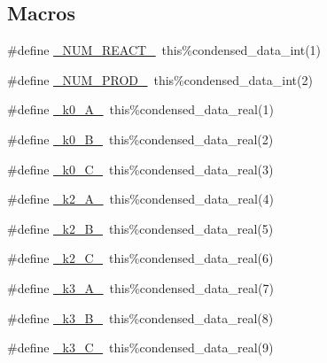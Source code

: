 \subsection*{Macros}
\begin{DoxyCompactItemize}
\item 
\#define \mbox{\hyperlink{rxn___c_m_a_q___o_h___h_n_o3_8_f90_aee1fee52189b85b8a55162815b7eb2ab}{\+\_\+\+N\+U\+M\+\_\+\+R\+E\+A\+C\+T\+\_\+}}~this\%condensed\+\_\+data\+\_\+int(1)
\item 
\#define \mbox{\hyperlink{rxn___c_m_a_q___o_h___h_n_o3_8_f90_a0ab2d7e00e334b5c52335f26ef6025e8}{\+\_\+\+N\+U\+M\+\_\+\+P\+R\+O\+D\+\_\+}}~this\%condensed\+\_\+data\+\_\+int(2)
\item 
\#define \mbox{\hyperlink{rxn___c_m_a_q___o_h___h_n_o3_8_f90_aabb54c582f3555126b59cb089e4be16c}{\+\_\+k0\+\_\+\+A\+\_\+}}~this\%condensed\+\_\+data\+\_\+real(1)
\item 
\#define \mbox{\hyperlink{rxn___c_m_a_q___o_h___h_n_o3_8_f90_a2e85b17924fcae4e8ac7d13cd5ad9dc3}{\+\_\+k0\+\_\+\+B\+\_\+}}~this\%condensed\+\_\+data\+\_\+real(2)
\item 
\#define \mbox{\hyperlink{rxn___c_m_a_q___o_h___h_n_o3_8_f90_a33edc6e996141c7b128a12cde9624602}{\+\_\+k0\+\_\+\+C\+\_\+}}~this\%condensed\+\_\+data\+\_\+real(3)
\item 
\#define \mbox{\hyperlink{rxn___c_m_a_q___o_h___h_n_o3_8_f90_aa61819ddc6aaa6275030c0ada2664978}{\+\_\+k2\+\_\+\+A\+\_\+}}~this\%condensed\+\_\+data\+\_\+real(4)
\item 
\#define \mbox{\hyperlink{rxn___c_m_a_q___o_h___h_n_o3_8_f90_a9eb83934d412685a55de48b3bdb7684b}{\+\_\+k2\+\_\+\+B\+\_\+}}~this\%condensed\+\_\+data\+\_\+real(5)
\item 
\#define \mbox{\hyperlink{rxn___c_m_a_q___o_h___h_n_o3_8_f90_a3ae107fbcbf31082a1331399405d37cc}{\+\_\+k2\+\_\+\+C\+\_\+}}~this\%condensed\+\_\+data\+\_\+real(6)
\item 
\#define \mbox{\hyperlink{rxn___c_m_a_q___o_h___h_n_o3_8_f90_a8b4546ebf122cbb02546529b836b0082}{\+\_\+k3\+\_\+\+A\+\_\+}}~this\%condensed\+\_\+data\+\_\+real(7)
\item 
\#define \mbox{\hyperlink{rxn___c_m_a_q___o_h___h_n_o3_8_f90_aeb1fb7f92103c077d7bcb66d5f474e72}{\+\_\+k3\+\_\+\+B\+\_\+}}~this\%condensed\+\_\+data\+\_\+real(8)
\item 
\#define \mbox{\hyperlink{rxn___c_m_a_q___o_h___h_n_o3_8_f90_a37af87fd701822f9086631cb96cb217d}{\+\_\+k3\+\_\+\+C\+\_\+}}~this\%condensed\+\_\+data\+\_\+real(9)
\item 

\end{DoxyCompactItemize}
